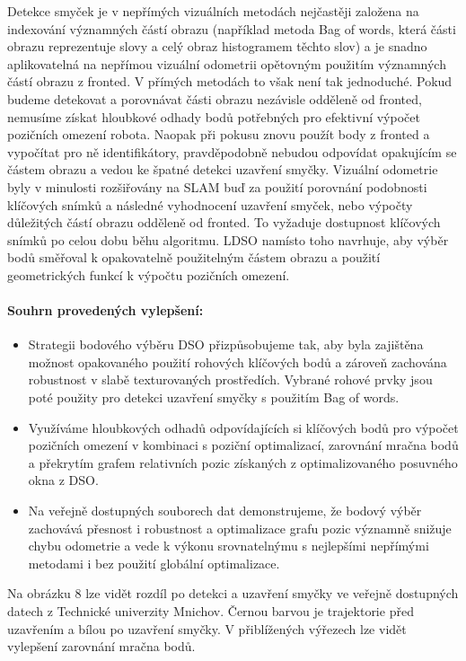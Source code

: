 \documentclass[12pt,a4paper]{article}
\begin{document}
Detekce smyček je v nepřímých vizuálních metodách nejčastěji založena na indexování významných částí obrazu (například metoda Bag of words, která části obrazu reprezentuje slovy a celý obraz histogramem těchto slov) a je snadno aplikovatelná na nepřímou vizuální odometrii opětovným použitím významných částí obrazu z fronted. V přímých metodách to však není tak jednoduché. Pokud budeme detekovat a porovnávat části obrazu nezávisle odděleně od fronted, nemusíme získat hloubkové odhady bodů potřebných pro efektivní výpočet pozičních omezení robota. Naopak při pokusu znovu použít body z fronted a vypočítat pro ně identifikátory, pravděpodobně nebudou odpovídat opakujícím se částem obrazu a vedou ke špatné detekci uzavření smyčky. Vizuální odometrie byly v minulosti rozšiřovány na SLAM buď za použití porovnání podobnosti klíčových snímků a následné vyhodnocení uzavření smyček, nebo výpočty důležitých částí obrazu odděleně od fronted. To vyžaduje dostupnost klíčových snímků po celou dobu běhu algoritmu. LDSO namísto toho navrhuje, aby výběr bodů směřoval k opakovatelně použitelným částem obrazu a použití geometrických funkcí k výpočtu pozičních omezení.

\paragraph*{Souhrn provedených vylepšení:}
\begin{itemize}
\item Strategii bodového výběru DSO přizpůsobujeme tak, aby byla zajištěna možnost opakovaného použití rohových klíčových bodů a zároveň zachována robustnost v slabě texturovaných prostředích. Vybrané rohové prvky jsou poté použity pro detekci uzavření smyčky s použitím Bag of words.
\item Využíváme hloubkových odhadů odpovídajících si klíčových bodů pro výpočet \newline pozičních omezení v kombinaci s poziční optimalizací, zarovnání mračna bodů a překrytím grafem relativních pozic získaných z optimalizovaného posuvného okna z DSO.
\item Na veřejně dostupných souborech dat demonstrujeme, že bodový výběr zachovává přesnost i robustnost a optimalizace grafu pozic významně snižuje chybu odometrie a vede k výkonu srovnatelnýmu s nejlepšími nepřímými metodami i bez použití globální optimalizace.
\end{itemize}

Na obrázku 8 lze vidět rozdíl po detekci a uzavření smyčky ve veřejně dostupných datech z Technické univerzity Mnichov. Černou barvou je trajektorie před uzavřením a bílou po uzavření smyčky. V přiblížených výřezech lze vidět vylepšení zarovnání mračna bodů.
\end{document}
